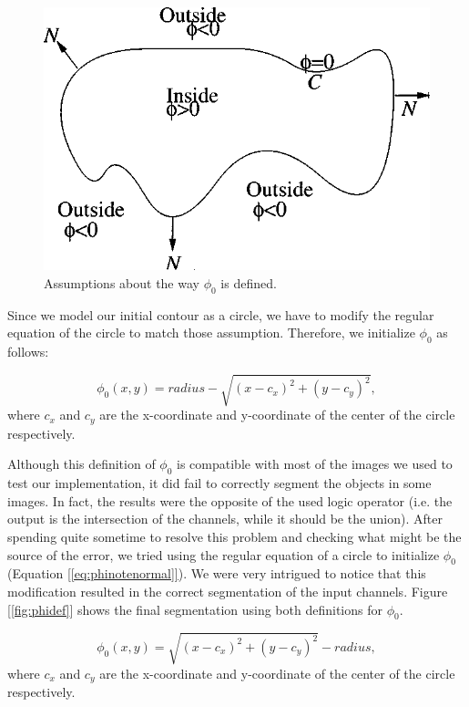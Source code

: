 \documentclass[10pt,twocolumn,letterpaper]{article}
\begin{document}
\begin{figure}[t]
\centering
\includegraphics[width=\textwidth]{phinote.png}
\caption{Assumptions about the way $\phi_0$ is defined.}
\label{fig:phinote}
\end{figure}

Since we model our initial contour as a circle, we have to modify the regular equation of the circle to match those assumption. Therefore, we initialize
$\phi_0$ as follows:

\begin{equation}
\label{eqn:phinote}
\phi_{0} (x, y) = radius - \sqrt{ (x - c_x)^2 + (y - c_y)^2 },
\end{equation}
where $c_x$ and $c_y$ are the x-coordinate and y-coordinate of the center of the circle respectively.

Although this definition of $\phi_0$ is compatible with most of the images we used to test our implementation, it did fail to correctly segment the objects in
some images. In fact, the results were the opposite of the used logic operator (i.e. the output is the intersection of the channels, while it should be the
union). After spending quite sometime to resolve this problem and checking what might be the source of the error, we tried using the regular equation of a
circle to initialize $\phi_0$ (Equation [\ref{eq:phinotenormal]}). We were very intrigued to notice that this modification resulted in the correct segmentation
of the input channels. Figure [\ref{fig:phidef}] shows the final segmentation using both definitions for $\phi_0$.

\begin{equation}
\label{eqn:phinotenormal}
\phi_{0} (x, y) = \sqrt{ (x - c_x)^2 + (y - c_y)^2 } - radius,
\end{equation}
where $c_x$ and $c_y$ are the x-coordinate and y-coordinate of the center of the circle respectively.
\end{document}
